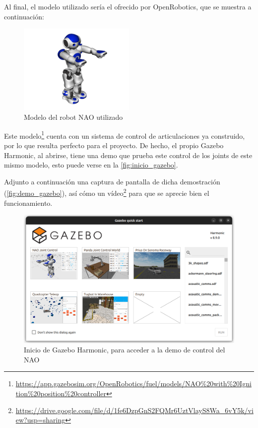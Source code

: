 Al final, el modelo utilizado sería el ofrecido por OpenRobotics, que se muestra a continuación:

\begin{figure}[H]
    \centering
    \includegraphics[width=0.5\textwidth]{figures/cap_3/modelo_original.png}
    \caption{Modelo del robot NAO utilizado}
    \label{fig:modelo_original}
\end{figure}

Este modelo\footnote{\url{https://app.gazebosim.org/OpenRobotics/fuel/models/NAO\%20with\%20Ignition\%20position\%20controller}} cuenta con un sistema de control de articulaciones ya construido, por lo que resulta perfecto para el proyecto. De hecho, el propio Gazebo Harmonic, al abrirse, tiene una demo que prueba este control de los joints de este mismo modelo, esto puede verse en la \autoref{fig:inicio_gazebo}.

Adjunto a continuación una captura de pantalla de dicha demostración (\autoref{fig:demo_gazebo}), así cómo un vídeo\footnote{\url{https://drive.google.com/file/d/1fe6DzpGnS2FQMr6UztVlayS8Wa_6vY5k/view?usp=sharing}} para que se aprecie bien el funcionamiento.

\begin{figure}[H]
    \centering
    \includegraphics[width=1\textwidth]{figures/cap_3/inicio_gazebo.png}
    \caption{Inicio de Gazebo Harmonic, para acceder a la demo de control del NAO}
    \label{fig:inicio_gazebo}
\end{figure}

